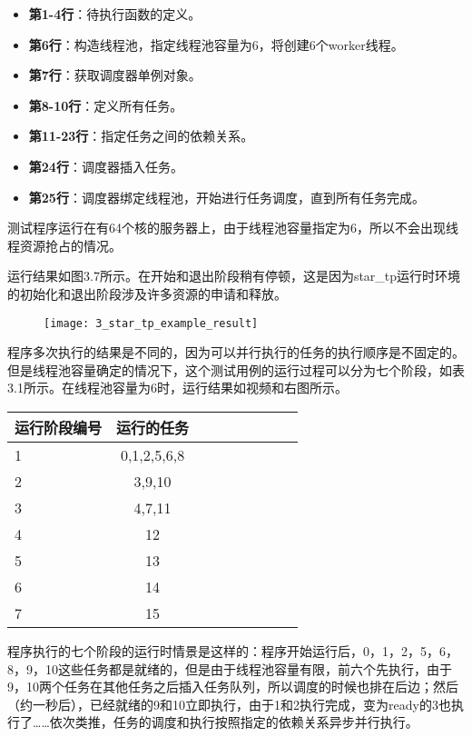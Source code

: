 \begin{itemize}
	\item \textbf{第1-4行}：待执行函数的定义。
	\item \textbf{第6行}：构造线程池，指定线程池容量为6，将创建6个worker线程。
	\item \textbf{第7行}：获取调度器单例对象。
	\item \textbf{第8-10行}：定义所有任务。
	\item \textbf{第11-23行}：指定任务之间的依赖关系。
	\item \textbf{第24行}：调度器插入任务。
	\item \textbf{第25行}：调度器绑定线程池，开始进行任务调度，直到所有任务完成。
\end{itemize}

测试程序运行在有64个核的服务器上，由于线程池容量指定为6，所以不会出现线程资源抢占的情况。

运行结果如图3.7所示。在开始和退出阶段稍有停顿，这是因为star\_tp运行时环境的初始化和退出阶段涉及许多资源的申请和释放。

\begin{figure}[!htbp]
    \centering
    \texttt{[image: 3\_star\_tp\_example\_result]}
    \label{fig:3_star_tp_example_result}
\end{figure}

程序多次执行的结果是不同的，因为可以并行执行的任务的执行顺序是不固定的。但是线程池容量确定的情况下，这个测试用例的运行过程可以分为七个阶段，如表3.1所示。在线程池容量为6时，运行结果如视频和右图所示。

\begin{table}[!htbp]
    \label{tab:sample}
    \centering
    \footnotesize
    \setlength{\tabcolsep}{4pt}
    \renewcommand{\arraystretch}{1.2} 
    \begin{tabular}{lcccccccc}
        \hline
        运行阶段编号 & 运行的任务 \\
        \hline
        1 & 0,1,2,5,6,8\\
        2 & 3,9,10\\
        3 & 4,7,11\\
        4 & 12\\
        5 & 13\\
        6 & 14\\
        7 & 15\\
        \hline
    \end{tabular}
\end{table}

程序执行的七个阶段的运行时情景是这样的：程序开始运行后，0，1，2，5，6，8，9，10这些任务都是就绪的，但是由于线程池容量有限，前六个先执行，由于9，10两个任务在其他任务之后插入任务队列，所以调度的时候也排在后边；然后（约一秒后），已经就绪的9和10立即执行，由于1和2执行完成，变为ready的3也执行了……依次类推，任务的调度和执行按照指定的依赖关系异步并行执行。


